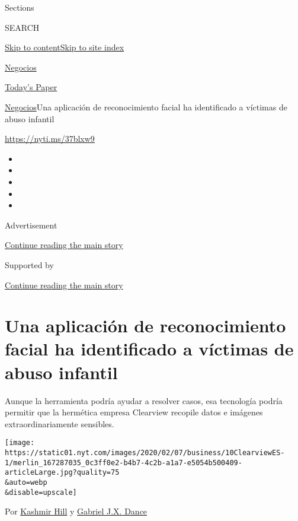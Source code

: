 Sections

SEARCH

\protect\hyperlink{site-content}{Skip to
content}\protect\hyperlink{site-index}{Skip to site index}

\href{https://www.nytimes.com/es/section/negocios}{Negocios}

\href{https://myaccount.nytimes.com/auth/login?response_type=cookie\&client_id=vi}{}

\href{https://www.nytimes.com/section/todayspaper}{Today's Paper}

\href{/es/section/negocios}{Negocios}\textbar{}Una aplicación de
reconocimiento facial ha identificado a víctimas de abuso infantil

\url{https://nyti.ms/37blxw9}

\begin{itemize}
\item
\item
\item
\item
\item
\end{itemize}

Advertisement

\protect\hyperlink{after-top}{Continue reading the main story}

Supported by

\protect\hyperlink{after-sponsor}{Continue reading the main story}

\hypertarget{una-aplicaciuxf3n-de-reconocimiento-facial-ha-identificado-a-vuxedctimas-de-abuso-infantil}{%
\section{Una aplicación de reconocimiento facial ha identificado a
víctimas de abuso
infantil}\label{una-aplicaciuxf3n-de-reconocimiento-facial-ha-identificado-a-vuxedctimas-de-abuso-infantil}}

Aunque la herramienta podría ayudar a resolver casos, esa tecnología
podría permitir que la hermética empresa Clearview recopile datos e
imágenes extraordinariamente sensibles.

\texttt{[image: https://static01.nyt.com/images/2020/02/07/business/10ClearviewES-1/merlin\_167287035\_0c3ff0e2-b4b7-4c2b-a1a7-e5054b500409-articleLarge.jpg?quality=75\\\&auto=webp\\\&disable=upscale]}

Por \href{https://www.nytimes.com/by/kashmir-hill}{Kashmir Hill} y
\href{https://www.nytimes.com/by/gabriel-dance}{Gabriel J.X. Dance}

